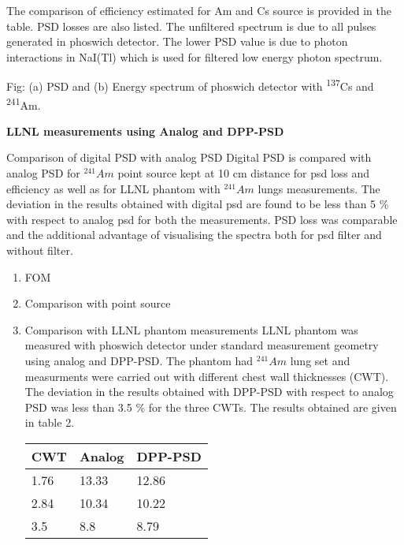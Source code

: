 \documentclass[10pt]{article}
\begin{document}
    The comparison of efficiency estimated for Am and Cs source is provided in the table. PSD losses are also listed.  
    The unfiltered spectrum is due to all pulses generated in phoswich detector. The lower PSD value is due to photon interactions in NaI(Tl) which is used for filtered low energy photon spectrum.  
    
    Fig: (a) PSD and (b) Energy spectrum of phoswich detector with \textsuperscript{137}Cs and \textsuperscript{241}Am.
    
     \textbf{LLNL measurements using Analog and DPP-PSD}

Comparison of digital PSD with analog PSD
Digital PSD is compared with analog PSD for $^{241}Am$ point source kept at 10 cm distance for psd loss and efficiency as well as for LLNL phantom with $^{241}Am$ lungs measurements. The deviation in the results obtained with digital psd are found to be less than 5 \% with respect to analog psd for both the measurements. PSD loss was comparable and the additional advantage of visualising the spectra both for psd filter and without filter.
 

\begin{enumerate} 
    \item  FOM 
    
    \item  Comparison with point source 
    
    \item  Comparison with LLNL phantom measurements 
         LLNL phantom was measured with phoswich detector under standard measurement geometry using analog and DPP-PSD. The phantom had $^{241}Am$ lung set and measurments were carried out with different chest wall thicknesses (CWT). The deviation in the results obtained with DPP-PSD with respect to analog PSD was less than 3.5 \% for the three CWTs. The results obtained are given in table 2. 
    
    \begin{table}
    	\centering
    	
    	\begin{tabular}{| l | l | l |}  
    		\hline
    		CWT & Analog & DPP-PSD \\
    		\hline
    		1.76 & 13.33 & 12.86 \\
    		\hline
    		2.84 & 10.34 & 10.22 \\
    		\hline
    		3.5 & 8.8 & 8.79  \\
    		\hline
    		
    	\end{tabular}
    	
    \end{table}
\end{enumerate}
 
\end{document}
